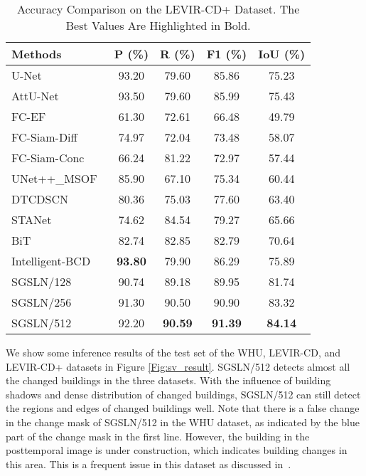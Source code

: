 \documentclass[journal]{IEEEtran}
\begin{document}
\begin{table}[!ht]
\caption{Accuracy Comparison on the LEVIR-CD+ Dataset. The Best Values Are Highlighted in Bold.}
\label{levircd+_result}
\centering
\begin{tabular}{lcccc}
\toprule
Methods & P (\%) & R (\%) & F1 (\%) & IoU (\%) \\
\midrule
U-Net~\cite{unet} & 93.20 & 79.60 & 85.86 & 75.23 \\
AttU-Net~\cite{aunet} & 93.50 & 79.60 & 85.99 & 75.43 \\
FC-EF~\cite{fcef} & 61.30 & 72.61 & 66.48 & 49.79 \\
FC-Siam-Diff~\cite{fcef} & 74.97 & 72.04 & 73.48 & 58.07 \\
FC-Siam-Conc~\cite{fcef} & 66.24 & 81.22 & 72.97 & 57.44 \\
UNet++\_MSOF~\cite{etecd} & 85.90 & 67.10 & 75.34 & 60.44 \\
DTCDSCN~\cite{dtcdstn} & 80.36 & 75.03 & 77.60 & 63.40 \\
STANet~\cite{sta} & 74.62 & 84.54 & 79.27 & 65.66 \\
BiT~\cite{bit} & 82.74 & 82.85 & 82.79 & 70.64 \\
Intelligent-BCD~\cite{ibcd} & \textbf{93.80} & 79.90 & 86.29 & 75.89 \\
SGSLN/128 & 90.74 & 89.18 & 89.95 & 81.74 \\
SGSLN/256 & 91.30 & 90.50 & 90.90 & 83.32 \\
SGSLN/512 & 92.20 & \textbf{90.59} & \textbf{91.39} & \textbf{84.14} \\
\bottomrule
\end{tabular}
\end{table}


We show some inference results of the test set of the WHU, LEVIR-CD, and LEVIR-CD+ datasets in Figure \ref{Fig:sv_result}. SGSLN/512 detects almost all the changed buildings in the three datasets. With the influence of building shadows and dense distribution of changed buildings, SGSLN/512 can still detect the regions and edges of changed buildings well. Note that there is a false change in the change mask of SGSLN/512 in the WHU dataset, as indicated by the blue part of the change mask in the first line. However, the building in the posttemporal image is under construction, which indicates building changes in this area. This is a frequent issue in this dataset as discussed in~\cite{lfc}.
\end{document}
